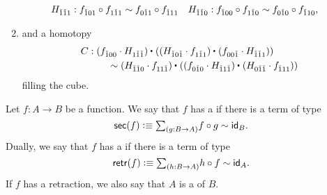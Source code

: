 \begin{defn}
\begin{enumerate}
\begin{align*}
H_{\check{1}\check{1}1} & : f_{\check{1}01}\circ f_{1\check{1}1} \sim f_{0\check{1}1}\circ f_{\check{1}11} & H_{\check{1}\check{1}0} & : f_{\check{1}00}\circ f_{1\check{1}0} \sim f_{0\check{1}0}\circ f_{\check{1}10},
\end{align*}
\item and a homotopy 
\begin{align*}
C & : \ct{(f_{\check{1}00}\cdot H_{1\check{1}\check{1}})}{(\ct{(H_{\check{1}0\check{1}}\cdot f_{1\check{1}1})}{(f_{00\check{1}}\cdot H_{\check{1}\check{1}1})})} \\
& \qquad \htpy \ct{(H_{\check{1}\check{1}0}\cdot f_{11\check{1}})}{(\ct{(f_{0\check{1}0}\cdot H_{\check{1}1\check{1}})}{(H_{0\check{1}\check{1}}\cdot f_{\check{1}11})})}
\end{align*}
filling the cube.
\end{enumerate}
\end{defn}

\begin{comment}
\begin{defn}\label{defn:htpy_nat}\index{homotopy!naturality|textbf}
Let $f,g:A\to B$ be functions, and consider a homotopy $H:f\htpy g$. We define identification
\begin{align*}
\mathsf{nat\usc{}htpy}(H,p) & : \prd{y:A}{p:x=y}\ct{H(x)}{\ap{g}{p}}=\ct{\ap{f}{p}}{H(y)}
\end{align*}
witnessing that the square
\begin{equation*}
\begin{tikzcd}
f(x) \arrow[r,equals,"H(x)"] \arrow[d,equals,swap,"\ap{f}{p}"] & g(x) \arrow[d,equals,"\ap{g}{p}"] \\
f(y) \arrow[r,equals,swap,"H(y)"] & g(y)
\end{tikzcd}
\end{equation*}
commutes for every $p:x=y$, as $\lam{\,\refl{x}} \rightunit(H(x))$. This square is also called the \define{naturality square} of the homotopy $H$ at $p$.
\end{defn}
\end{comment}

\begin{defn}
Let $f:A\to B$ be a function. We say that $f$ has a  if there is a term of type
\begin{equation*}
\sections(f) \defeq \sm{g:B\to A} f\circ g\htpy \idfunc[B].
\end{equation*}
Dually, we say that $f$ has a  if there is a term of type
\begin{equation*}
\retractions(f) \defeq \sm{h:B\to A} h\circ f\htpy \idfunc[A].
\end{equation*}
If $f$ has a retraction, we also say that $A$ is a  of $B$.
\end{defn}

